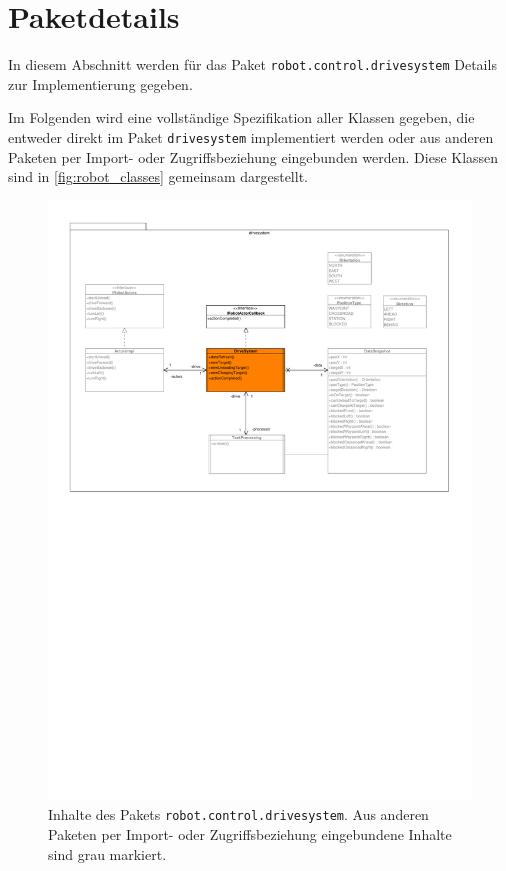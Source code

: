 
\section{Paketdetails}
\label{sec:details}

In diesem Abschnitt werden für das Paket \texttt{robot.control.drivesystem} Details zur Implementierung gegeben.

Im Folgenden wird eine vollständige Spezifikation aller Klassen gegeben, die entweder direkt im Paket \texttt{drivesystem} implementiert werden oder aus anderen Paketen per Import- oder Zugriffsbeziehung eingebunden werden.
Diese Klassen sind in \autoref{fig:robot_classes} gemeinsam dargestellt.

\begin{figure}[h]
	\centering
	\includegraphics[width=\textwidth]{img/robot_classes}
	\caption{Inhalte des Pakets \texttt{robot.control.drivesystem}. Aus anderen Paketen per Import- oder Zugriffsbeziehung eingebundene Inhalte sind grau markiert.}
	\label{fig:robot_classes}
\end{figure}


